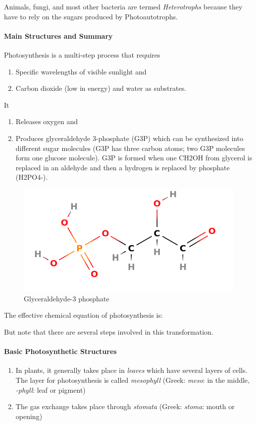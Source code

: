 \documentclass[12pt]{article}
\begin{document}
Animals, fungi, and most other bacteria are termed \emph{Heterotrophs} because they have to rely on the sugars produced by Photoautotrophs.

\paragraph{Main Structures and Summary}
Photosynthesis is a multi-step process that requires
\begin{enumerate}
    \item Specific wavelengths of visible sunlight and
    \item Carbon dioxide (low in energy) and water as substrates.
\end{enumerate}
It 
\begin{enumerate}
    \item Releases oxygen and
    \item Produces glyceraldehyde 3-phosphate (G3P) which can be synthesized into different sugar molecules (G3P has three carbon atoms; two G3P molecules form one glucose molecule). G3P is formed when one CH2OH from glycerol is replaced in an aldehyde and then a hydrogen is replaced by phosphate (H2PO4-).
\end{enumerate}
\begin{figure}[ht!]
    \centering
    \includegraphics[width=0.8\linewidth]{g3p.png}
    \caption{Glyceraldehyde-3 phosphate}
    \label{fig: g3p}
\end{figure}

The effective chemical equation of photosynthesis is:


But note that there are several steps involved in this transformation.

\paragraph{Basic Photosynthetic Structures}
\begin{enumerate}
    \item In plants, it generally takes place in \emph{leaves} which have several layers of cells. The layer for photosynthesis is called \emph{mesophyll} (Greek: \emph{meso}: in the middle, \emph{-phyll}: leaf or pigment)
    \item The gas exchange takes place through \emph{stomata} (Greek: \emph{stoma}: mouth or opening)
\end{enumerate}
\end{document}
